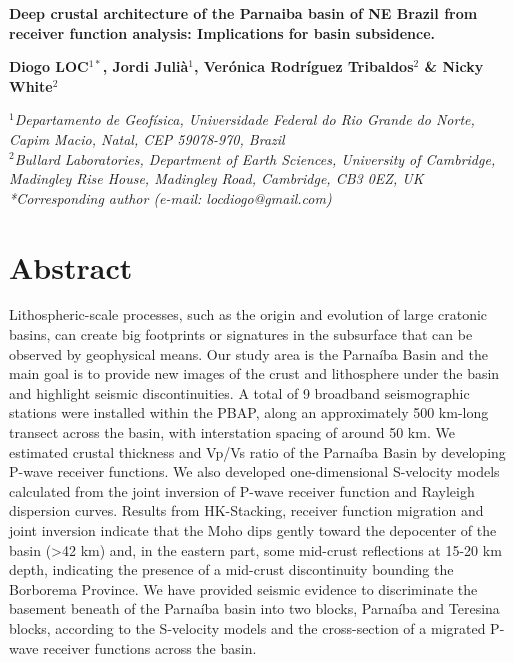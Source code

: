 \documentclass[paper,11pt]{geophysics}
\begin{document}
\begin{center}
\textbf{\LARGE
Deep crustal architecture of the Parnaiba basin of NE Brazil from receiver function analysis: Implications for basin subsidence.
}
\linebreak 

\textbf{Diogo LOC$^{1*}$, Jordi Julià$^{1}$, Verónica Rodríguez Tribaldos$^{2}$ \& Nicky White$^{2}$}
\linebreak 

\textit{
$^{1}$Departamento de Geofísica, Universidade Federal do Rio Grande do Norte, Capim Macio, Natal, CEP 59078-970, Brazil
\\
$^{2}$Bullard Laboratories, Department of Earth Sciences, University of Cambridge, Madingley Rise House, Madingley Road, Cambridge, CB3 0EZ, UK
\\
*Corresponding author (e-mail: locdiogo@gmail.com)
}

\end{center} 
\section{Abstract}

Lithospheric-scale processes, such as the origin and evolution of large cratonic basins, can create big footprints or signatures in the subsurface that can be observed by geophysical means. Our study area is the Parnaíba Basin and the main goal is to provide new images of the crust and lithosphere under the basin and highlight seismic discontinuities. A total of 9 broadband seismographic stations were installed within the PBAP, along an approximately 500 km-long transect across the basin, with interstation spacing of around 50 km. We estimated crustal thickness and Vp/Vs ratio of the Parnaíba Basin by developing P-wave receiver functions. We also developed one-dimensional S-velocity models calculated from the joint inversion of P-wave receiver function and Rayleigh dispersion curves. Results from HK-Stacking, receiver function migration and joint inversion indicate that the Moho dips gently toward the depocenter of the basin (>42 km) and, in the eastern part, some mid-crust reflections at 15-20 km depth, indicating the presence of a mid-crust discontinuity bounding the Borborema Province. We have provided seismic evidence to discriminate the basement beneath of the Parnaíba basin into two blocks, Parnaíba and Teresina blocks, according to the S-velocity models and the cross-section of a migrated P-wave receiver functions across the basin.
\end{document}

